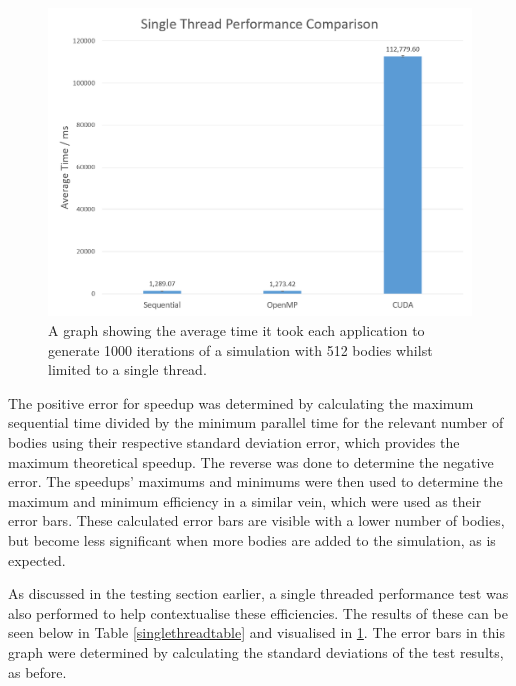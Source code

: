 \documentclass[12pt,journal,transmag]{IEEEtran}
\begin{document}
	\begin{figure}[!h]
		\centering
		\includegraphics[width=1.5\columnwidth]{IMAGES/singlethread}
		\caption{A graph showing the average time it took each application to generate 1000 iterations of a simulation with 512 bodies whilst limited to a single thread.}
		\label{graph5}
	\end{figure}	

	The positive error for speedup was determined by calculating the maximum sequential time divided by the minimum parallel time for the relevant number of bodies using their respective standard deviation error, which provides the maximum theoretical speedup. The reverse was done to determine the negative error. The speedups' maximums and minimums were then used to determine the maximum and minimum efficiency in a similar vein, which were used as their error bars. These calculated error bars are visible with a lower number of bodies, but become less significant when more bodies are added to the simulation, as is expected.
	
	As discussed in the testing section earlier, a single threaded performance test was also performed to help contextualise these efficiencies. The results of these can be seen below in Table \ref{singlethreadtable} and visualised in \ref{graph5}. The error bars in this graph were determined by calculating the standard deviations of the test results, as before. 

	\begin{table}[!h]
		\caption{Single Thread Performance Comparison}
		\label{singlethreadtable}
		\centering
	\end{table}
\end{document}

